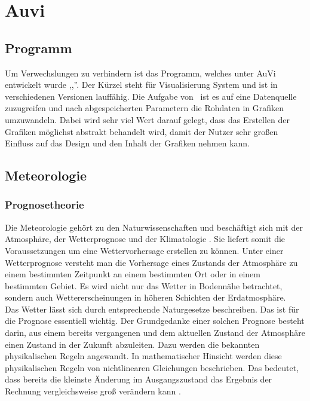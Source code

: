 \section{Auvi}

\subsection{Programm} %
Um Verwechslungen zu verhindern ist das Programm,
welches unter AuVi entwickelt wurde ,,\vs ''.
Der Kürzel steht für Visualisierung System und ist in verschiedenen Versionen lauffähig.
Die Aufgabe von \vs\ ist es auf eine Datenquelle zuzugreifen
und nach abgespeicherten Parametern die Rohdaten in Grafiken umzuwandeln.
Dabei wird sehr viel Wert darauf gelegt,
dass das Erstellen der Grafiken möglichst abstrakt behandelt wird,
damit der Nutzer sehr großen Einfluss auf das Design und den Inhalt der Grafiken nehmen kann.

\subsection{Meteorologie} %

\subsubsection{Prognosetheorie} %
Die Meteorologie gehört zu den Naturwissenschaften und
beschäftigt sich mit der Atmosphäre, der Wetterprognose und der Klimatologie \cite{meteorologie}.
Sie liefert somit die Voraussetzungen um eine Wettervorhersage erstellen zu können.
Unter einer Wetterprognose versteht man die Vorhersage eines Zustands
der Atmosphäre zu einem bestimmten Zeitpunkt an einem bestimmten Ort
oder in einem bestimmten Gebiet.
Es wird nicht nur das Wetter in Bodennähe betrachtet,
sondern auch Wettererscheinungen in höheren Schichten der Erdatmosphäre.
\\
Das Wetter lässt sich durch entsprechende Naturgesetze beschreiben.
Das ist für die Prognose essentiell wichtig.
Der Grundgedanke einer solchen Prognose besteht darin,
aus einem bereits vergangenen und dem aktuellen Zustand
der Atmosphäre einen Zustand in der Zukunft abzuleiten.
Dazu werden die bekannten physikalischen Regeln angewandt.
In mathematischer Hinsicht werden diese physikalischen Regeln von
nichtlinearen Gleichungen beschrieben.
Das bedeutet, dass bereits die kleinste Änderung im Ausgangszustand
das Ergebnis der Rechnung vergleichsweise groß verändern kann \cite{nonlinear}.


